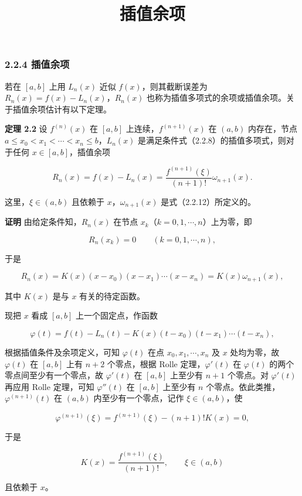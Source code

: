 \documentclass[
  10pt,
  fontset=fandol]{ctexart}
\title{插值余项}
\author{}
\date{}
\begin{document}
\maketitle

\subsubsection{2.2.4 插值余项}\label{ux63d2ux503cux4f59ux9879}

若在 \([a,b]\) 上用 \(L_n(x)\) 近似 \(f(x)\)，则其截断误差为 \(R_n(x)=f(x)-L_n(x)\)，\(R_n(x)\) 也称为插值多项式的余项或插值余项。关于插值余项估计有以下定理。

\textbf{定理 2.2} 设 \(f^{(n)}(x)\) 在 \([a,b]\) 上连续，\(f^{(n+1)}(x)\) 在 \((a,b)\) 内存在，节点 \(a\le x_0<x_1<\cdots<x_n\le b\)，\(L_n(x)\) 是满足条件式（2.2.8）的插值多项式，则对于任何 \(x\in[a,b]\)，插值余项

\[
R_n(x)=f(x)-L_n(x)=\frac{f^{(n+1)}(\xi)}{(n+1)!}\omega_{n+1}(x).
\tag{2.2.14}
\]

这里，\(\xi\in(a,b)\) 且依赖于 \(x\)，\(\omega_{n+1}(x)\) 是式（2.2.12）所定义的。

\textbf{证明} 由给定条件知，\(R_n(x)\) 在节点 \(x_k\)（\(k=0,1,\cdots,n\)）上为零，即

\[
R_n(x_k)=0\qquad(k=0,1,\cdots,n),
\]

于是

\[
R_n(x)=K(x)(x-x_0)(x-x_1)\cdots(x-x_n)=K(x)\omega_{n+1}(x),
\tag{2.2.15}
\]

其中 \(K(x)\) 是与 \(x\) 有关的待定函数。

现把 \(x\) 看成 \([a,b]\) 上一个固定点，作函数

\[
\varphi(t)=f(t)-L_n(t)-K(x)(t-x_0)(t-x_1)\cdots(t-x_n),
\]

根据插值条件及余项定义，可知 \(\varphi(t)\) 在点 \(x_0,x_1,\cdots,x_n\) 及 \(x\) 处均为零，故 \(\varphi(t)\) 在 \([a,b]\) 上有 \(n+2\) 个零点，根据 Rolle 定理，\(\varphi'(t)\) 在 \(\varphi(t)\) 的两个零点间至少有一个零点，故 \(\varphi'(t)\) 在 \([a,b]\) 上至少有 \(n+1\) 个零点。对 \(\varphi'(t)\) 再应用 Rolle 定理，可知 \(\varphi''(t)\) 在 \([a,b]\) 上至少有 \(n\) 个零点。依此类推，\(\varphi^{(n+1)}(t)\) 在 \((a,b)\) 内至少有一个零点，记作 \(\xi\in(a,b)\)，使

\[
\varphi^{(n+1)}(\xi)=f^{(n+1)}(\xi)-(n+1)!K(x)=0,
\]

于是

\[
K(x)=\frac{f^{(n+1)}(\xi)}{(n+1)!},\qquad \xi\in(a,b)
\]

且依赖于 \(x\)。
\end{document}
